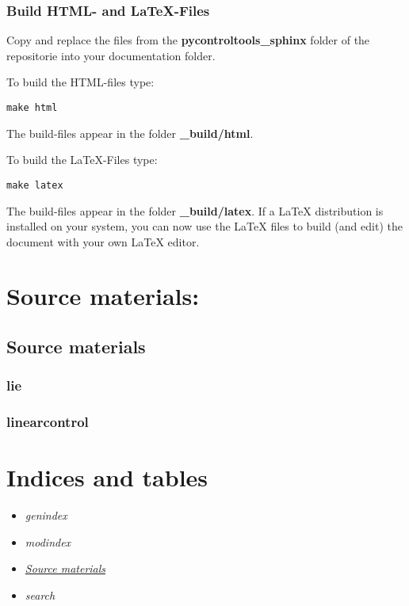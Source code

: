 \documentclass[letterpaper,10pt,english]{sphinxmanual}
\begin{document}
\subsection{Build HTML- and LaTeX-Files}
\label{README:build-html-and-latex-files}
Copy and replace the files from the \textbf{pycontroltools\_sphinx} folder of the
repositorie into your documentation folder.

To build the HTML-files type:

\begin{Verbatim}[commandchars=\\\{\}]
make html
\end{Verbatim}

The build-files appear in the folder \textbf{\_build/html}.

To build the LaTeX-Files type:

\begin{Verbatim}[commandchars=\\\{\}]
make latex
\end{Verbatim}

The build-files appear in the folder \textbf{\_build/latex}.
If a LaTeX distribution is installed on your system, you can now use
the LaTeX files to build (and edit) the document with your own LaTeX editor.


\chapter{Source materials:}
\label{index:source-materials}

\section{Source materials}
\label{pycontroltools_sources:pycontroltools-sources-label}\label{pycontroltools_sources:source-materials}\label{pycontroltools_sources::doc}

\subsection{lie}
\label{pycontroltools_sources:lie}

\subsection{linearcontrol}
\label{pycontroltools_sources:linearcontrol}

\chapter{Indices and tables}
\label{index:indices-and-tables}\begin{itemize}
\item {} 
\emph{genindex}

\item {} 
\emph{modindex}

\item {} 
{\hyperref[pycontroltools_sources:pycontroltools-sources-label]{\emph{Source materials}}}

\item {} 
\emph{search}

\end{itemize}
\end{document}
